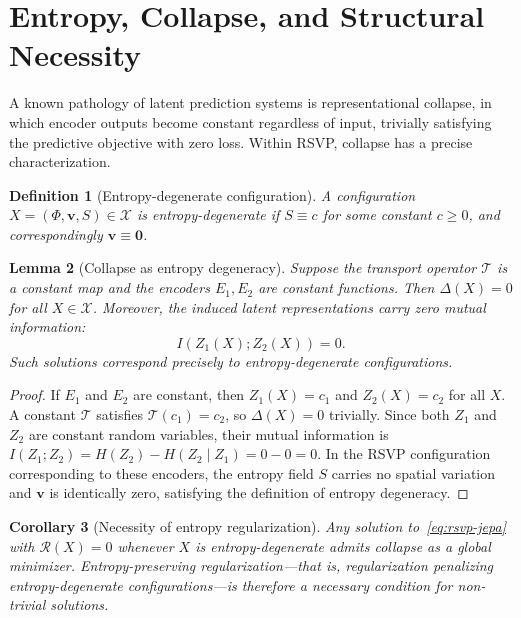 \documentclass[12pt, oneside]{article}
\newtheorem{definition}{Definition}[section]
\newtheorem{lemma}[definition]{Lemma}
\newtheorem{corollary}[definition]{Corollary}
\begin{document}
\section{Entropy, Collapse, and Structural Necessity}
\label{sec:collapse}

A known pathology of latent prediction systems is representational collapse, in which encoder outputs become constant regardless of input, trivially satisfying the predictive objective with zero loss. Within RSVP, collapse has a precise characterization.

\begin{definition}[Entropy-degenerate configuration]
A configuration $X = (\Phi, \mathbf{v}, S) \in \mathcal{X}$ is entropy-degenerate if $S \equiv c$ for some constant $c \geq 0$, and correspondingly $\mathbf{v} \equiv \mathbf{0}$.
\end{definition}

\begin{lemma}[Collapse as entropy degeneracy]
\label{lem:collapse}
Suppose the transport operator $\mathcal{T}$ is a constant map and the encoders $E_1, E_2$ are constant functions. Then $\Delta(X) = 0$ for all $X \in \mathcal{X}$. Moreover, the induced latent representations carry zero mutual information:
\[
I(Z_1(X); Z_2(X)) = 0.
\]
Such solutions correspond precisely to entropy-degenerate configurations.
\end{lemma}

\begin{proof}
If $E_1$ and $E_2$ are constant, then $Z_1(X) = c_1$ and $Z_2(X) = c_2$ for all $X$. A constant $\mathcal{T}$ satisfies $\mathcal{T}(c_1) = c_2$, so $\Delta(X) = 0$ trivially. Since both $Z_1$ and $Z_2$ are constant random variables, their mutual information is $I(Z_1; Z_2) = H(Z_2) - H(Z_2 \mid Z_1) = 0 - 0 = 0$. In the RSVP configuration corresponding to these encoders, the entropy field $S$ carries no spatial variation and $\mathbf{v}$ is identically zero, satisfying the definition of entropy degeneracy.
\end{proof}

\begin{corollary}[Necessity of entropy regularization]
Any solution to~\eqref{eq:rsvp-jepa} with $\mathcal{R}(X) = 0$ whenever $X$ is entropy-degenerate admits collapse as a global minimizer. Entropy-preserving regularization---that is, regularization penalizing entropy-degenerate configurations---is therefore a necessary condition for non-trivial solutions.
\end{corollary}
\end{document}
